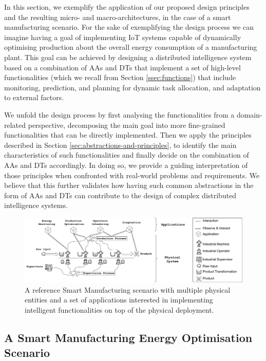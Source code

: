 In this section, we exemplify the application of our proposed design principles and the resulting micro- and macro-architectures, in the case of a smart manufacturing scenario.
For the sake of exemplifying the design process
we can imagine having a goal of implementing IoT systems capable of dynamically optimising production about the overall energy consumption of a manufacturing plant.
%
This goal can be achieved by designing a distributed intelligence system based on a combination of AAs and DTs that implement a set of high-level functionalities (which we recall from Section \ref{ssec:functions}) that include monitoring, prediction, and planning for dynamic task allocation, and adaptation to external factors.

We unfold the design process by first analysing the functionalities from a domain-related perspective, decomposing the main goal into more fine-grained functionalities that can be directly implemented. 
Then we apply the principles described in Section \ref{sec:abstractions-and-principles}, to identify the main characteristics of such functionalities and finally decide on the combination of AAs and DTs accordingly.
%
In doing so, we provide a guiding interpretation of those principles when confronted with real-world problems and requirements.
%
We believe that this further validates how having such common abstractions in the form of AAs and DTs can contribute to the design of complex distributed intelligence systems.

\begin{figure}
    \centering
    \includegraphics[width=\columnwidth]{figures/dt-mas/smart_manufacturing_scenario.pdf}
    \caption{A reference Smart Manufacturing scenario with multiple physical entities and a set of applications interested in implementing intelligent functionalities on top of the physical deployment.}
    \label{fig:smart_manufacturing_scenario}
\end{figure}

\subsection{A Smart Manufacturing Energy Optimisation Scenario}

